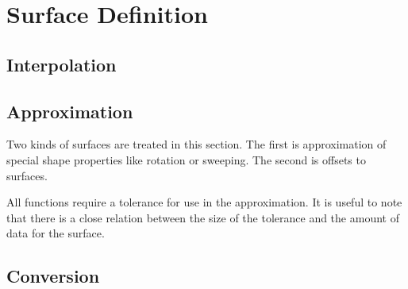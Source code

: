 \chapter{Surface Definition}
\label{surfacedefinition}
\section{Interpolation}

\pgsbreak

\pgsbreak

\pgsbreak

\pgsbreak

\pgsbreak

\pgsbreak

\pgsbreak

\pgsbreak

\pgsbreak

\pgsbreak

\pgsbreak

\pgsbreak
\section{Approximation}
Two kinds of surfaces are treated in this section. The first is
approximation of special shape properties like rotation or sweeping. The
second is offsets to surfaces.

All functions require a tolerance for use in the approximation. It is
useful to note that there is a close relation between the size of the
tolerance and the amount of data for the surface.

\pgsbreak

\pgsbreak

\pgsbreak

\pgsbreak

\pgsbreak
\section{Conversion}

\pgsbreak

\pgsbreak

\pgsbreak

\pgsbreak

\pgsbreak

\pgsbreak

\pgsbreak

\pgsbreak

\vfill
\newpage
